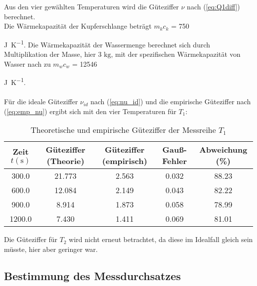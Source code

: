 
Aus den vier gewählten Temperaturen wird die Güteziffer $\nu$ nach (\ref{eq:Q1diff}) berechnet.
\\
Die Wärmekapazität der Kupferschlange beträgt $m_{k} c_{k}$ = 750 {\unit[per-mode=fraction]{\joule\per\kelvin}. 
Die Wärmekapazität der Wassermenge berechnet sich durch Multiplikation der Masse, hier 3 $\unit{\kilo\gram}$, mit der spezifischen
Wärmekapazität von Wasser nach \cite[278]{demtroeder1} zu $m_{w} c_{w}$ = 12546 {\unit[per-mode=fraction]{\joule\per\kelvin}. \\
\\
Für die ideale Güteziffer $\nu_{id}$ nach (\ref{eq:nu_id}) und die empirische Güteziffer nach (\ref{eq:emp_nu})
ergibt sich mit den vier Temperaturen für $T_{1}$:

\begin{table}
  \centering
  \caption{Theoretische und empirische Güteziffer der Messreihe $T_{1}$}
  \label{tab:güteziffern_t1}
  \begin{tabular}{c c c c c}
    \toprule
    {Zeit $t (\unit{\second})$} &
    Güteziffer (Theorie) &
    Güteziffer (empirisch) &
    Gauß-Fehler &
    Abweichung (\%) \\
    \midrule
     300.0 &                21.773 &                   2.563 &        0.032 &           88.23 \\
     600.0 &                12.084 &                   2.149 &        0.043 &           82.22 \\
     900.0 &                 8.914 &                   1.873 &        0.058 &           78.99 \\
    1200.0 &                 7.430 &                   1.411 &        0.069 &           81.01 \\
    \bottomrule
    \end{tabular}
\end{table}

Die Güteziffer für $T_{2}$ wird nicht erneut betrachtet, da diese im Idealfall gleich sein
müsste, hier aber geringer war. \\

\subsection{Bestimmung des Messdurchsatzes}

}}
